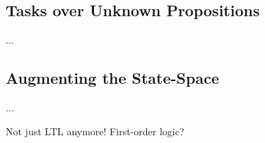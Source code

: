 \subsection{Tasks over Unknown Propositions}

...


\subsection{Augmenting the State-Space} %

...

Not just LTL anymore! First-order logic?